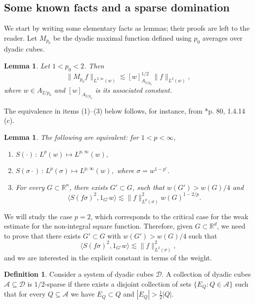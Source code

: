 \documentclass[11pt,reqno]{amsart}
\theoremstyle{plain} %
\newtheorem{lemma}[equation]{Lemma}
\newcommand{\1}{ \mathbbm{1}}   %
\theoremstyle{definition}
\newtheorem{definition}[equation]{Definition}
\theoremstyle{remark}
\numberwithin{equation}{section}
\begin{document}
\subsection{Some known facts and a sparse domination}

We start by writing some elementary facts as lemmas; their proofs are left to the reader. Let $M_{p_0}$ be the dyadic maximal function  defined using $p_0$ averages over dyadic cubes.

\begin{lemma}
Let $1<p_0<2$. Then
\begin{equation}\label{e.maxpo2}
\lVert M_{p_0}f \rVert_{L^{2,\infty}(w)}\lesssim [w]_{A_{2/p_0}}^{1/2} \lVert f \rVert_{L^{2}(w)},
\end{equation}
where $w\in A_{2/p_0}$ and $[w]_{A_{2/p_0}}$ is its associated constant.
\end{lemma}

The equivalence in items (1)--(3) below follows, for instance, from \cite{GrafakosC}*{p. 80, 1.4.14 (c)}. 

\begin{lemma}
The following are equivalent: for $1<p<\infty$,
\begin{enumerate}
\item $S(\cdot)\,:\, L^p(w) \mapsto  L^{p,\infty}(w),$
\item $S(\sigma\cdot)\,:\, L^p(\sigma) \mapsto  L^{p,\infty}(w),$ where $\sigma=w^{1-p'}$.
\item For every $G\subset \mathbb R^n$, there exists $G'\subset G$, such that $w(G')>w(G)/4$ and 
$$
\langle S(f \sigma)^2, 1_{G'}w\rangle \lesssim \lVert f\rVert _{L^p(\sigma)}^2w(G)^{1-2/p}.
$$
\end{enumerate}
\end{lemma}

We will study the case $p=2$, which corresponds to the critical case for the weak estimate for the non-integral square function. Therefore, given $G \subset \mathbb R^d$, we need to prove that there exists $G'\subset G$ with $w(G')>w(G)/4$ such that 
$$
\langle S(f \sigma)^2, 1_{G'}w\rangle \lesssim \lVert f \rVert_{L^{2}(\sigma)}^{2},
$$
and we are interested in the explicit constant in terms of the weight. 

\begin{definition}
    Consider a system of dyadic cubes $\mathcal{D}$. A collection of dyadic cubes $\mathcal{A}\subseteq \mathcal{D}$ is $1/2$-sparse if there exists a disjoint collection of sets $\{E_Q:Q\in \mathcal{A}\}$ such that for every $Q\subseteq \mathcal{A}$ we have $E_Q\subset Q$ and $|E_Q|>\frac12|Q|$.
\end{definition}
\end{document}
